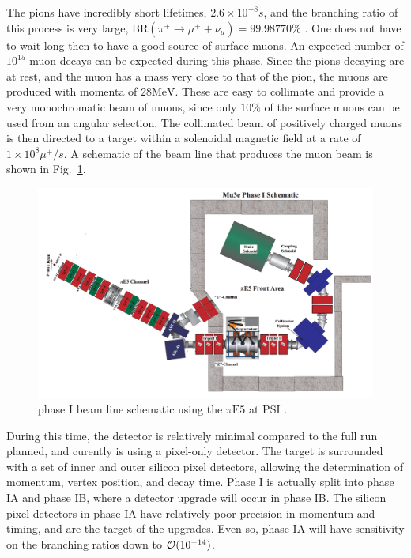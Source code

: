 \noindent The pions have incredibly short lifetimes, $2.6 \times 10^{-8}s$, and the branching ratio of this process is very large, $\textrm{BR}(\pi^+ \rightarrow \mu^+ + \nu_\mu) = 99.98770\%$ \cite{Agashe:2014kda}.
One does not have to wait long then to have a good source of surface muons.
An expected number of $10^{15}$ muon decays can be expected during this phase.
Since the pions decaying are at rest, and the muon has a mass very close to that of the pion, the muons are produced with momenta of $28\textrm{MeV}$.
These are easy to collimate and provide a very monochromatic beam of muons, since only $10\%$ of the surface muons can be used from an angular selection.
The collimated beam of positively charged muons is then directed to a target within a solenoidal magnetic field at a rate of $1 \times 10^8 \mu^+/s$.
A schematic of the beam line that produces the muon beam is shown in Fig.\ \ref{fig:mu3e_phaseI_schematic}.

\begin{figure}[h]
    \centering
    \includegraphics[width = \textwidth]{Figures/experiments/mu3e_phase1_schematic.png}
    \caption{\mueee phase I beam line schematic using the $\pi\textrm{E5}$ at PSI \cite{Blondel:2013ia}.}
    \label{fig:mu3e_phaseI_schematic}
\end{figure}

During this time, the detector is relatively minimal compared to the full run planned, and curently is using a pixel-only detector.
The target is surrounded with a set of inner and outer silicon pixel detectors, allowing the determination of momentum, vertex position, and decay time.
Phase I is actually split into phase IA and phase IB, where a detector upgrade will occur in phase IB\@.
The silicon pixel detectors in phase IA have relatively poor precision in momentum and timing, and are the target of the upgrades.
Even so, phase IA will have sensitivity on the branching ratios down to $\operatorname{\mathcal{O}}(10^{-14})$.

